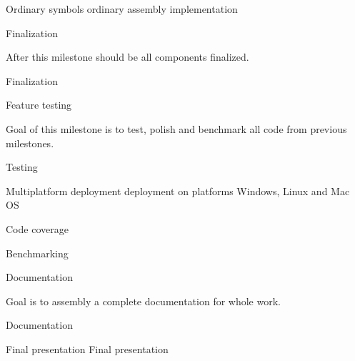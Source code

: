 			\itemwp Ordinary symbols 
					\tiny ordinary assembly implementation
		\eenum
		
	\itemm Finalization 
	
		\small After this milestone should be all components finalized. 
		
		\bwp
			\itemwp Finalization 
		\eenum
	
	\itemm Feature testing 
	
		\small Goal of this milestone is to test, polish and benchmark all code from previous milestones.
		
		\bwp
			\itemwp Testing 
			
			\itemwp Multiplatform deployment 
					\tiny deployment on platforms Windows, Linux and Mac OS
					
			\itemwp Code coverage 
			
			\itemwp Benchmarking 
		\eenum
	
	\itemm Documentation 
	
		\small Goal is to assembly a complete documentation for whole work.
		
		\bwp
			\itemwp Documentation 
		\eenum
	
	\itemm Final presentation 
		\bwp
			\itemwp Final presentation 
		\eenum
\eenum

